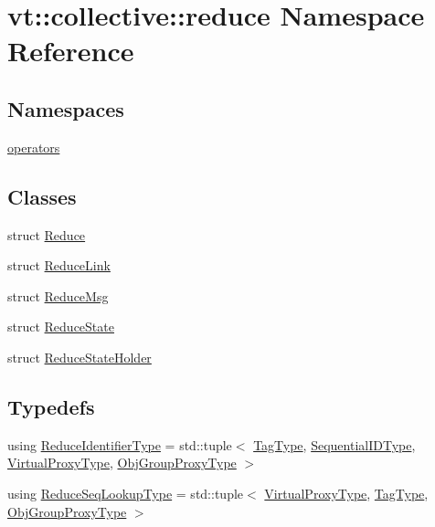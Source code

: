 \hypertarget{namespacevt_1_1collective_1_1reduce}{}\section{vt\+:\+:collective\+:\+:reduce Namespace Reference}
\label{namespacevt_1_1collective_1_1reduce}
\subsection*{Namespaces}
\begin{DoxyCompactItemize}
\item 
 \hyperlink{namespacevt_1_1collective_1_1reduce_1_1operators}{operators}
\end{DoxyCompactItemize}
\subsection*{Classes}
\begin{DoxyCompactItemize}
\item 
struct \hyperlink{structvt_1_1collective_1_1reduce_1_1_reduce}{Reduce}
\item 
struct \hyperlink{structvt_1_1collective_1_1reduce_1_1_reduce_link}{Reduce\+Link}
\item 
struct \hyperlink{structvt_1_1collective_1_1reduce_1_1_reduce_msg}{Reduce\+Msg}
\item 
struct \hyperlink{structvt_1_1collective_1_1reduce_1_1_reduce_state}{Reduce\+State}
\item 
struct \hyperlink{structvt_1_1collective_1_1reduce_1_1_reduce_state_holder}{Reduce\+State\+Holder}
\end{DoxyCompactItemize}
\subsection*{Typedefs}
\begin{DoxyCompactItemize}
\item 
using \hyperlink{namespacevt_1_1collective_1_1reduce_ad688d164ad18b2011198cbc97cc84b74}{Reduce\+Identifier\+Type} = std\+::tuple$<$ \hyperlink{namespacevt_a84ab281dae04a52a4b243d6bf62d0e52}{Tag\+Type}, \hyperlink{namespacevt_a3063d4db3b879d6dd2c7b8d50995c7f6}{Sequential\+I\+D\+Type}, \hyperlink{namespacevt_a1b417dd5d684f045bb58a0ede70045ac}{Virtual\+Proxy\+Type}, \hyperlink{namespacevt_ad7cae989df485fccca57f0792a880a8e}{Obj\+Group\+Proxy\+Type} $>$
\item 
using \hyperlink{namespacevt_1_1collective_1_1reduce_a3e69dddbbc89a0c9e9b986c5642efeba}{Reduce\+Seq\+Lookup\+Type} = std\+::tuple$<$ \hyperlink{namespacevt_a1b417dd5d684f045bb58a0ede70045ac}{Virtual\+Proxy\+Type}, \hyperlink{namespacevt_a84ab281dae04a52a4b243d6bf62d0e52}{Tag\+Type}, \hyperlink{namespacevt_ad7cae989df485fccca57f0792a880a8e}{Obj\+Group\+Proxy\+Type} $>$
\end{DoxyCompactItemize}


